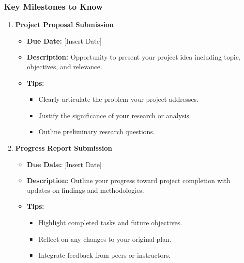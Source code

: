 \documentclass[aspectratio=169]{beamer}
\begin{document}
\begin{frame}[fragile]
    \frametitle{Key Milestones to Know}
    \begin{enumerate}
        \item \textbf{Project Proposal Submission}
        \begin{itemize}
            \item \textbf{Due Date:} [Insert Date]
            \item \textbf{Description:} Opportunity to present your project idea including topic, objectives, and relevance.
            \item \textbf{Tips:}
            \begin{itemize}
                \item Clearly articulate the problem your project addresses.
                \item Justify the significance of your research or analysis.
                \item Outline preliminary research questions.
            \end{itemize}
        \end{itemize}

        \item \textbf{Progress Report Submission}
        \begin{itemize}
            \item \textbf{Due Date:} [Insert Date]
            \item \textbf{Description:} Outline your progress toward project completion with updates on findings and methodologies.
            \item \textbf{Tips:}
            \begin{itemize}
                \item Highlight completed tasks and future objectives.
                \item Reflect on any changes to your original plan.
                \item Integrate feedback from peers or instructors.
            \end{itemize}
        \end{itemize}


\end{enumerate}
\end{frame}
\end{document}
